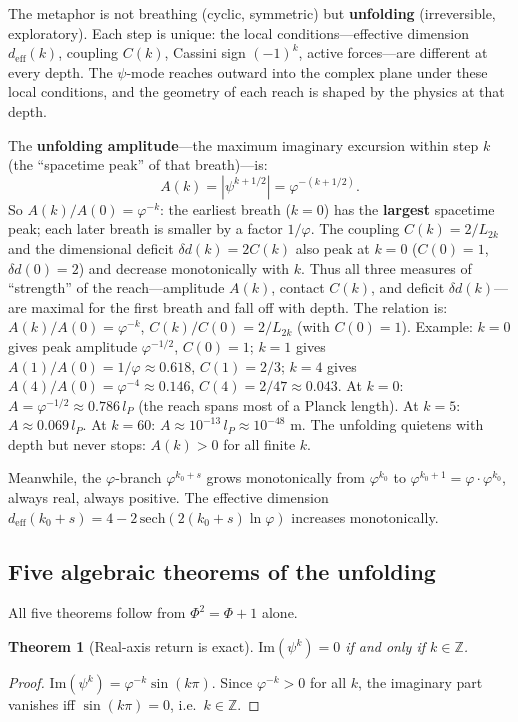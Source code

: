 \documentclass[12pt,a4paper]{article}
\newtheorem{theorem}{Theorem}[section]
\begin{document}
The metaphor is not breathing (cyclic, symmetric) but \textbf{unfolding} (irreversible, exploratory). Each step is unique: the local conditions---effective dimension $d_{\mathrm{eff}}(k)$, coupling $C(k)$, Cassini sign $(-1)^k$, active forces---are different at every depth. The $\psi$-mode reaches outward into the complex plane under these local conditions, and the geometry of each reach is shaped by the physics at that depth.

The \textbf{unfolding amplitude}---the maximum imaginary excursion within step $k$ (the ``spacetime peak'' of that breath)---is:
\begin{equation}
A(k) = |\psi^{k+1/2}| = \varphi^{-(k+1/2)}.
\end{equation}
So $A(k)/A(0) = \varphi^{-k}$: the earliest breath ($k = 0$) has the \textbf{largest} spacetime peak; each later breath is smaller by a factor $1/\varphi$. The coupling $C(k) = 2/L_{2k}$ and the dimensional deficit $\delta d(k) = 2C(k)$ also peak at $k = 0$ ($C(0)=1$, $\delta d(0)=2$) and decrease monotonically with $k$. Thus all three measures of ``strength'' of the reach---amplitude $A(k)$, contact $C(k)$, and deficit $\delta d(k)$---are maximal for the first breath and fall off with depth. The relation is: $A(k)/A(0) = \varphi^{-k}$, $C(k)/C(0) = 2/L_{2k}$ (with $C(0)=1$). Example: $k=0$ gives peak amplitude $\varphi^{-1/2}$, $C(0)=1$; $k=1$ gives $A(1)/A(0)=1/\varphi \approx 0.618$, $C(1)=2/3$; $k=4$ gives $A(4)/A(0)=\varphi^{-4} \approx 0.146$, $C(4)=2/47 \approx 0.043$. At $k = 0$: $A = \varphi^{-1/2} \approx 0.786\,l_P$ (the reach spans most of a Planck length). At $k = 5$: $A \approx 0.069\,l_P$. At $k = 60$: $A \approx 10^{-13}\,l_P \approx 10^{-48}$ m. The unfolding quietens with depth but never stops: $A(k) > 0$ for all finite $k$.

Meanwhile, the $\varphi$-branch $\varphi^{k_0+s}$ grows monotonically from $\varphi^{k_0}$ to $\varphi^{k_0+1} = \varphi \cdot \varphi^{k_0}$, always real, always positive. The effective dimension $d_{\mathrm{eff}}(k_0+s) = 4 - 2\,\mathrm{sech}(2(k_0{+}s)\ln\varphi)$ increases monotonically.

\subsection{Five algebraic theorems of the unfolding}

All five theorems follow from $\Phi^2 = \Phi + 1$ alone.

\begin{theorem}[Real-axis return is exact]
\label{thm:real-return}
$\mathrm{Im}(\psi^k) = 0$ if and only if $k \in \mathbb{Z}$.
\end{theorem}
\begin{proof}
$\mathrm{Im}(\psi^{k}) = \varphi^{-k}\sin(k\pi)$. Since $\varphi^{-k} > 0$ for all $k$, the imaginary part vanishes iff $\sin(k\pi) = 0$, i.e.\ $k \in \mathbb{Z}$.
\end{proof}
\end{document}
